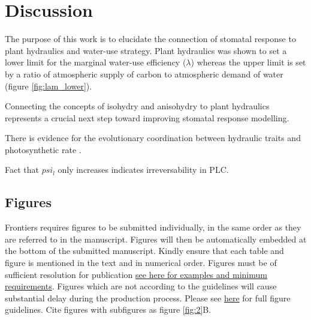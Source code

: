 \documentclass[utf8]{frontiersSCNS} %
\begin{document}


\section{Discussion}

The purpose of this work is to elucidate the connection of stomatal response to plant hydraulics and water-use strategy. Plant hydraulics was shown to set a lower limit for the marginal water-use efficiency ($\lambda$) whereas the upper limit is set by a ratio of atmospheric supply of carbon to atmospheric demand of water (figure \ref{fig:lam_lower}).

Connecting the concepts of isohydry and anisohydry to plant hydraulics represents a crucial next step toward improving stomatal response modelling. 

There is evidence for the evolutionary coordination between hydraulic traits and photosynthetic rate \citep{Scoffoni2016}. 

Fact that $psi_l$ only increases indicates irreversability in PLC.

\subsection{Figures}
Frontiers requires figures to be submitted individually, in the same order as they are referred to in the manuscript. Figures will then be automatically embedded at the bottom of the submitted manuscript. Kindly ensure that each table and figure is mentioned in the text and in numerical order. Figures must be of sufficient resolution for publication \href{http://home.frontiersin.org/about/author-guidelines#ResolutionRequirements}{see here for examples and minimum requirements}. Figures which are not according to the guidelines will cause substantial delay during the production process. Please see \href{http://home.frontiersin.org/about/author-guidelines#GeneralStyleGuidelinesforFigures}{here} for full figure guidelines. Cite figures with subfigures as figure \ref{fig:2}B.
\end{document}
